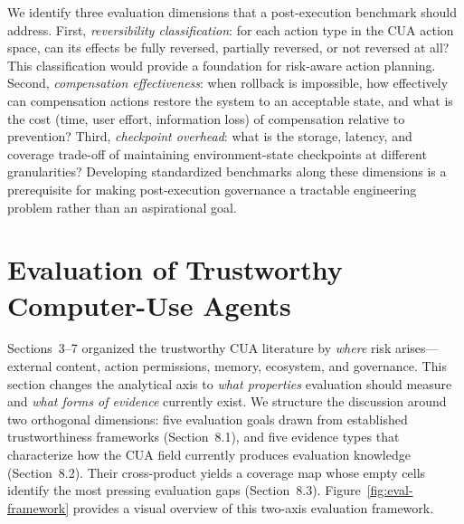 We identify three evaluation dimensions that a post-execution benchmark should address. First, \emph{reversibility classification}: for each action type in the CUA action space, can its effects be fully reversed, partially reversed, or not reversed at all? This classification would provide a foundation for risk-aware action planning. Second, \emph{compensation effectiveness}: when rollback is impossible, how effectively can compensation actions restore the system to an acceptable state, and what is the cost (time, user effort, information loss) of compensation relative to prevention? Third, \emph{checkpoint overhead}: what is the storage, latency, and coverage trade-off of maintaining environment-state checkpoints at different granularities? Developing standardized benchmarks along these dimensions is a prerequisite for making post-execution governance a tractable engineering problem rather than an aspirational goal.


\section{Evaluation of Trustworthy Computer-Use Agents}
\label{sec:evaluation}

Sections~3--7 organized the trustworthy CUA literature by \emph{where} risk arises---external content, action permissions, memory, ecosystem, and governance. This section changes the analytical axis to \emph{what properties} evaluation should measure and \emph{what forms of evidence} currently exist. We structure the discussion around two orthogonal dimensions: five evaluation goals drawn from established trustworthiness frameworks (Section~8.1), and five evidence types that characterize how the CUA field currently produces evaluation knowledge (Section~8.2). Their cross-product yields a coverage map whose empty cells identify the most pressing evaluation gaps (Section~8.3). Figure~\ref{fig:eval-framework} provides a visual overview of this two-axis evaluation framework.

